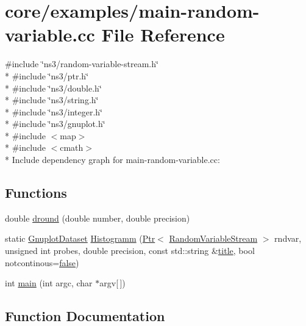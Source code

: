 \hypertarget{main-random-variable_8cc}{}\section{core/examples/main-\/random-\/variable.cc File Reference}
\label{main-random-variable_8cc}
{\ttfamily \#include \char`\"{}ns3/random-\/variable-\/stream.\+h\char`\"{}}\\*
{\ttfamily \#include \char`\"{}ns3/ptr.\+h\char`\"{}}\\*
{\ttfamily \#include \char`\"{}ns3/double.\+h\char`\"{}}\\*
{\ttfamily \#include \char`\"{}ns3/string.\+h\char`\"{}}\\*
{\ttfamily \#include \char`\"{}ns3/integer.\+h\char`\"{}}\\*
{\ttfamily \#include \char`\"{}ns3/gnuplot.\+h\char`\"{}}\\*
{\ttfamily \#include $<$map$>$}\\*
{\ttfamily \#include $<$cmath$>$}\\*
Include dependency graph for main-\/random-\/variable.cc\+:
\subsection*{Functions}
\begin{DoxyCompactItemize}
\item 
double \hyperlink{main-random-variable_8cc_a03c6ffa77bf73ef1606f168290f71948}{dround} (double number, double precision)
\item 
static \hyperlink{classns3_1_1GnuplotDataset}{Gnuplot\+Dataset} \hyperlink{main-random-variable_8cc_a2cfd3837ab3f2e816cf53486d7a186b5}{Histogramm} (\hyperlink{classns3_1_1Ptr}{Ptr}$<$ \hyperlink{classns3_1_1RandomVariableStream}{Random\+Variable\+Stream} $>$ rndvar, unsigned int probes, double precision, const std\+::string \&\hyperlink{lte__link__budget__x2__handover__measures_8m_a3f4b991df405379f6917e1683ed5a8c8}{title}, bool notcontinous=\hyperlink{lte__cqi__generation_8m_ab1bef239d413c4da139c4bac92cd657a}{false})
\item 
int \hyperlink{main-random-variable_8cc_a0ddf1224851353fc92bfbff6f499fa97}{main} (int argc, char $\ast$argv\mbox{[}$\,$\mbox{]})
\end{DoxyCompactItemize}


\subsection{Function Documentation}
